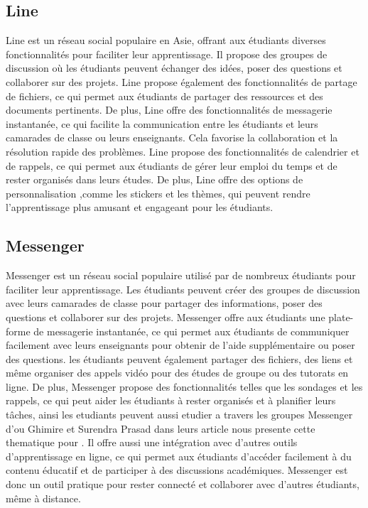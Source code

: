 \documentclass[12pt,a4paper,titlepage]{article}
\begin{document}
\subsection{Line}


Line est un réseau social populaire en Asie, offrant aux étudiants diverses fonctionnalités pour faciliter leur apprentissage. Il propose des groupes de discussion où les étudiants peuvent échanger des idées, poser des questions et collaborer sur des projets. Line propose également des fonctionnalités de partage de fichiers, ce qui permet aux étudiants de partager des ressources et des documents pertinents. De plus, Line offre des fonctionnalités de messagerie instantanée, ce qui facilite la communication entre les étudiants et leurs camarades de classe ou leurs enseignants. Cela favorise la collaboration et la résolution rapide des problèmes. Line propose des fonctionnalités de calendrier et de rappels, ce qui permet aux étudiants de gérer leur emploi du temps et de rester organisés dans leurs études. De plus, Line offre des options de personnalisation ,comme les stickers et les thèmes, qui peuvent rendre l'apprentissage plus amusant et engageant pour les étudiants.
\subsection{Messenger }
Messenger est un réseau social populaire utilisé par de nombreux étudiants pour faciliter leur apprentissage. Les étudiants peuvent créer des groupes de discussion avec leurs camarades de classe pour partager des informations, poser des questions et collaborer sur des projets. Messenger offre aux étudiants une plate-forme de messagerie instantanée, ce qui permet aux étudiants de communiquer facilement avec leurs enseignants pour obtenir de l'aide supplémentaire ou poser des questions.  les étudiants peuvent également partager des fichiers, des liens et même organiser des appels vidéo pour des études de groupe ou des tutorats en ligne. De plus, Messenger propose des fonctionnalités telles que les sondages et les rappels, ce qui peut aider les étudiants à rester organisés et à planifier leurs tâches, ainsi les etudiants peuvent aussi etudier a travers les groupes Messenger d'ou Ghimire et Surendra Prasad dans leurs article \citep{ghimire2022secondaire} nous presente cette thematique pour . Il offre aussi une intégration avec d'autres outils d'apprentissage en ligne, ce qui permet aux étudiants d'accéder facilement à du contenu éducatif et de participer à des discussions académiques. Messenger est donc un outil pratique pour rester connecté et collaborer avec d'autres étudiants, même à distance.
\end{document}
